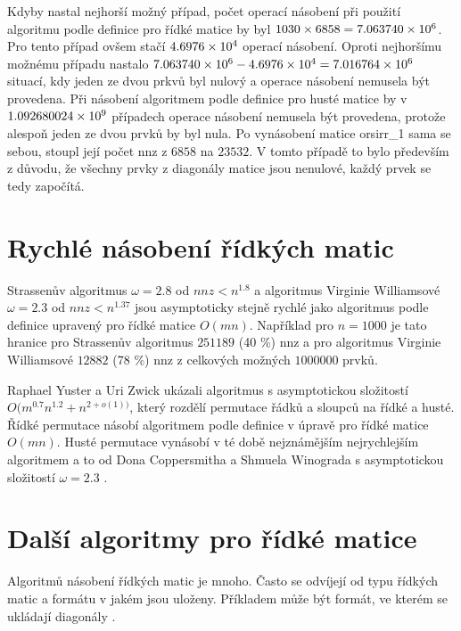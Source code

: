 Kdyby nastal nejhorší možný případ, počet operací násobení při použití algoritmu podle definice pro řídké matice by byl $1030 \times 6858 = 7.063740\times 10^{6}$. Pro tento případ ovšem stačí $4.6976\times 10^{4}$ operací násobení. Oproti nejhoršímu možnému případu nastalo $7.063740\times 10^{6} - 4.6976\times 10^{4} = 7.016764\times 10^{6}$ situací, kdy jeden ze dvou prkvů byl nulový a operace násobení nemusela být provedena. Při násobení algoritmem podle definice pro husté matice by v $1.092680024\times 10^{9}$ případech operace násobení nemusela být provedena, protože alespoň jeden ze dvou prvků by byl nula. Po vynásobení matice orsirr\_1 sama se sebou, stoupl její počet nnz z $6858$ na $23532$. V tomto případě to bylo především z důvodu, že všechny prvky z diagonály matice jsou nenulové, každý prvek se tedy započítá.

\label{fast-sparse}
\section{Rychlé násobení řídkých matic}

Strassenův algoritmus $\omega=2.8$ od $nnz<n^{1.8}$ a algoritmus Virginie Williamsové $\omega=2.3$ od $nnz<n^{1.37}$ jsou asymptoticky stejně rychlé jako algoritmus podle definice upravený pro řídké matice $O(mn)$. Například pro $n=1000$ je tato hranice pro Strassenův algoritmus $251189$ (40 \%) nnz a pro algoritmus Virginie Williamsové $12882$ (78 \%) nnz z celkových možných $1000000$ prvků.

Raphael Yuster a Uri Zwick ukázali algoritmus \cite{DBLP:journals/talg/YusterZ05} s asymptotickou složitostí $O(m^{0.7}n^{1.2}+n^{2+o(1))}$, který rozdělí permutace řádků a sloupců na řídké a husté. Řídké permutace násobí algoritmem podle definice v úpravě pro řídké matice $O(mn)$. Husté permutace vynásobí v té době nejznámějším nejrychlejším algoritmem a to od Dona Coppersmitha a Shmuela Winograda s asymptotickou složitostí $\omega=2.3$ \cite{DBLP:journals/jsc/CoppersmithW90}.

\section{Další algoritmy pro řídké matice}

Algoritmů násobení řídkých matic je mnoho. Často se odvíjejí od typu řídkých matic a formátu v jakém jsou uloženy. Příkladem může být formát, ve kterém se ukládají diagonály \cite{diagonalTvrdikSimecek}.
